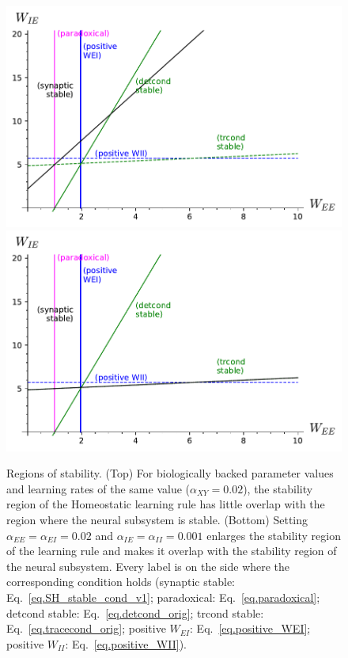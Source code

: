 \documentclass[
twocolumn,
]{article}
\newcommand{\EE}{\mathit{EE}}
\newcommand{\EI}{\mathit{EI}}
\newcommand{\IE}{\mathit{IE}}
\newcommand{\II}{\mathit{II}}
\newcommand{\XY}{\mathit{XY}}
\begin{document}
\begin{figure}[!ht]
\centering
\includegraphics[width=\linewidth]{SH_stability}
\includegraphics[width=\linewidth]{SH_stability_slowInh.pdf}
\caption{Regions of stability. (Top) For biologically backed parameter values and learning rates of the same value ($\alpha_{\XY} = 0.02$), the stability region of the Homeostatic learning rule has little overlap with the region where the neural subsystem is stable. (Bottom) Setting $\alpha_{\EE}=\alpha_{\EI}=0.02$ and $\alpha_{\IE}=\alpha_{\II}=0.001$ enlarges the stability region of the learning rule and makes it overlap with the stability region of the neural subsystem.
Every label is on the side where the corresponding condition holds (synaptic stable: Eq.\ \ref{eq.SH_stable_cond_v1}; paradoxical: Eq.\ \ref{eq.paradoxical}; detcond stable: Eq.\ \ref{eq.detcond_orig}; trcond stable: Eq.\ \ref{eq.tracecond_orig}; positive $W_{\EI}$: Eq.\ \ref{eq.positive_WEI}; positive $W_{\II}$: Eq.\ \ref{eq.positive_WII}).}
\label{fig.SH_stability}
\end{figure}
\end{document}
